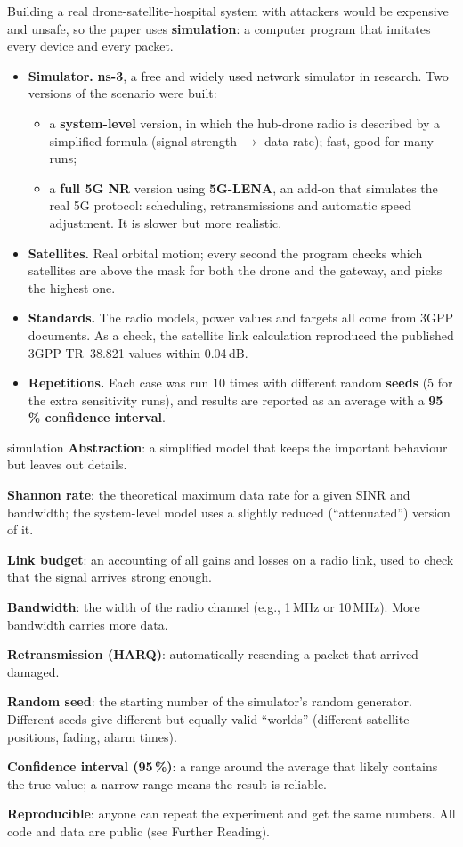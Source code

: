 \documentclass[11pt,a4paper]{article}
\newcommand{\kt}[1]{\textbf{\color{navy}#1}}
\begin{document}
Building a real drone-satellite-hospital system with attackers would be expensive and unsafe, so the paper uses \kt{simulation}: a computer program that imitates every device and every packet.

\begin{itemize}
\item \textbf{Simulator.} \kt{ns-3}, a free and widely used network simulator in research. Two versions of the scenario were built:
  \begin{itemize}
  \item a \kt{system-level} version, in which the hub-drone radio is described by a simplified formula (signal strength $\rightarrow$ data rate); fast, good for many runs;
  \item a \kt{full 5G NR} version using \kt{5G-LENA}, an add-on that simulates the real 5G protocol: scheduling, retransmissions and automatic speed adjustment. It is slower but more realistic.
  \end{itemize}
\item \textbf{Satellites.} Real orbital motion; every second the program checks which satellites are above the mask for both the drone and the gateway, and picks the highest one.
\item \textbf{Standards.} The radio models, power values and targets all come from 3GPP documents. As a check, the satellite link calculation reproduced the published 3GPP TR~38.821 values within 0.04\,dB.
\item \textbf{Repetitions.} Each case was run 10 times with different random \kt{seeds} (5 for the extra sensitivity runs), and results are reported as an average with a \kt{95\,\% confidence interval}.
\end{itemize}

\begin{term}{simulation}
\kt{Abstraction}: a simplified model that keeps the important behaviour but leaves out details.\par
\kt{Shannon rate}: the theoretical maximum data rate for a given SINR and bandwidth; the system-level model uses a slightly reduced (``attenuated'') version of it.\par
\kt{Link budget}: an accounting of all gains and losses on a radio link, used to check that the signal arrives strong enough.\par
\kt{Bandwidth}: the width of the radio channel (e.g., 1\,MHz or 10\,MHz). More bandwidth carries more data.\par
\kt{Retransmission (HARQ)}: automatically resending a packet that arrived damaged.\par
\kt{Random seed}: the starting number of the simulator's random generator. Different seeds give different but equally valid ``worlds'' (different satellite positions, fading, alarm times).\par
\kt{Confidence interval (95\,\%)}: a range around the average that likely contains the true value; a narrow range means the result is reliable.\par
\kt{Reproducible}: anyone can repeat the experiment and get the same numbers. All code and data are public (see Further Reading).
\end{term}
\end{document}
